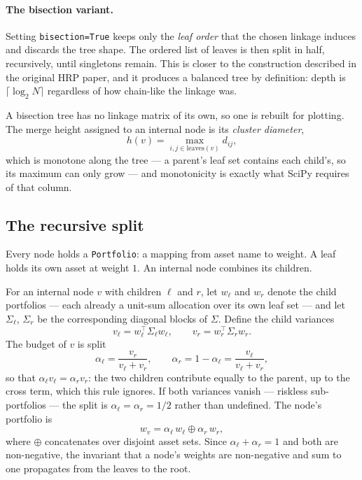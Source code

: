\documentclass[11pt,a4paper]{article}
\newcommand{\code}[1]{\texttt{#1}}
\begin{document}
\paragraph{The bisection variant.}
Setting \code{bisection=True} keeps only the \emph{leaf order} that the chosen
linkage induces and discards the tree shape. The ordered list of leaves is then
split in half, recursively, until singletons remain. This is closer to the
construction described in the original HRP paper, and it produces a balanced
tree by definition: depth is $\lceil \log_2 N \rceil$ regardless of how
chain-like the linkage was.

A bisection tree has no linkage matrix of its own, so one is rebuilt for
plotting. The merge height assigned to an internal node is its \emph{cluster
diameter},
\begin{equation}
  h(v) = \max_{i,j \in \mathrm{leaves}(v)} d_{ij},
\end{equation}
which is monotone along the tree --- a parent's leaf set contains each child's,
so its maximum can only grow --- and monotonicity is exactly what SciPy requires
of that column.

\subsection{The recursive split}

Every node holds a \code{Portfolio}: a mapping from asset name to weight. A leaf
holds its own asset at weight $1$. An internal node combines its children.

For an internal node $v$ with children $\ell$ and $r$, let $w_\ell$ and $w_r$
denote the child portfolios --- each already a unit-sum allocation over its own
leaf set --- and let $\Sigma_\ell$, $\Sigma_r$ be the corresponding diagonal
blocks of $\Sigma$. Define the child variances
\begin{equation}
  v_\ell = w_\ell^{\top} \Sigma_\ell w_\ell,
  \qquad
  v_r = w_r^{\top} \Sigma_r w_r .
  \label{eq:blockvar}
\end{equation}
The budget of $v$ is split
\begin{equation}
  \alpha_\ell = \frac{v_r}{v_\ell + v_r},
  \qquad
  \alpha_r = 1 - \alpha_\ell = \frac{v_\ell}{v_\ell + v_r},
  \label{eq:split}
\end{equation}
so that $\alpha_\ell v_\ell = \alpha_r v_r$: the two children contribute equally
to the parent, up to the cross term, which this rule ignores. If both variances
vanish --- riskless sub-portfolios --- the split is $\alpha_\ell = \alpha_r =
1/2$ rather than undefined. The node's portfolio is
\begin{equation}
  w_v = \alpha_\ell \, w_\ell \oplus \alpha_r \, w_r ,
\end{equation}
where $\oplus$ concatenates over disjoint asset sets. Since $\alpha_\ell +
\alpha_r = 1$ and both are non-negative, the invariant that a node's weights are
non-negative and sum to one propagates from the leaves to the root.
\end{document}
